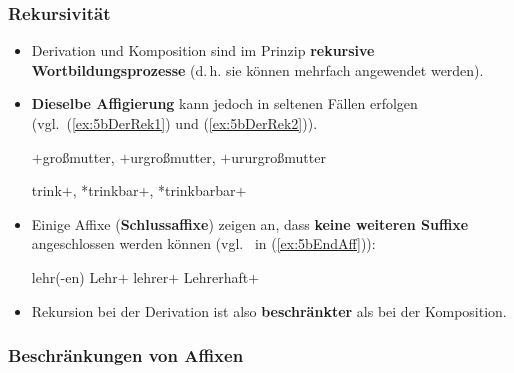 \begin{frame}
\frametitle{Rekursivität}

\begin{itemize}
\item Derivation und Komposition sind im Prinzip \textbf{rekursive Wortbildungsprozesse} (d.\,h. sie können mehrfach angewendet werden). 

\item \textbf{Dieselbe Affigierung} kann jedoch in seltenen Fällen erfolgen\\
(vgl.\ (\ref{ex:5bDerRek1}) und (\ref{ex:5bDerRek2})).

\ea 
\ea\label{ex:5bDerRek1} $+$großmutter, $+$urgroßmutter, $+$ururgroßmutter

\ex\label{ex:5bDerRek2} trink$+$, *trinkbar$+$, *trinkbarbar$+$
\z 
\z 

\pause 

\item Einige Affixe (\textbf{Schlussaffixe}) zeigen an, dass \textbf{keine weiteren Suffixe} angeschlossen werden können (vgl.\  in (\ref{ex:5bEndAff})):

\ea\label{ex:5bEndAff} lehr(-en) \ras Lehr$+$ \ras lehrer$+$ \ras Lehrerhaft$+$
\z

\item Rekursion bei der Derivation ist also \textbf{beschränkter} als bei der Komposition.

\end{itemize}


\end{frame}


\subsubsection{Beschränkungen von Affixen}

